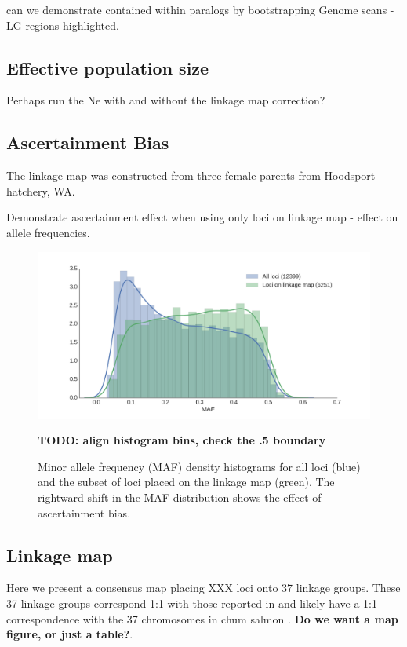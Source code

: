 \documentclass[12pt,  one column]{article}
\begin{document}
can we demonstrate contained within paralogs by bootstrapping 
Genome scans - LG regions highlighted.

\subsection*{Effective population size}


Perhaps run the Ne with and without the linkage map correction?

\subsection*{Ascertainment Bias}
The linkage map was constructed from three female parents from Hoodsport hatchery, WA.

Demonstrate ascertainment effect when using only loci on linkage map - effect on allele frequencies.

\begin{figure}[H]
\includegraphics[scale=.3]{figures/supplemental/ascertainment.png}
\caption{Minor allele frequency (MAF) density histograms for all loci (blue) and the subset of loci placed on the linkage map (green). The rightward shift in the MAF distribution shows the effect of ascertainment bias.} \textbf{TODO: align histogram bins, check the .5 boundary}
\end{figure}

\subsection*{Linkage map}
Here we present a consensus map placing XXX loci onto 37 linkage groups.  These 37 linkage groups correspond 1:1 with those reported in \citep{Waples2015} and likely have a 1:1 correspondence with the 37 chromosomes in chum salmon \citep{Phillips2001}. \textbf{Do we want a map figure, or just a table?}.
\end{document}
